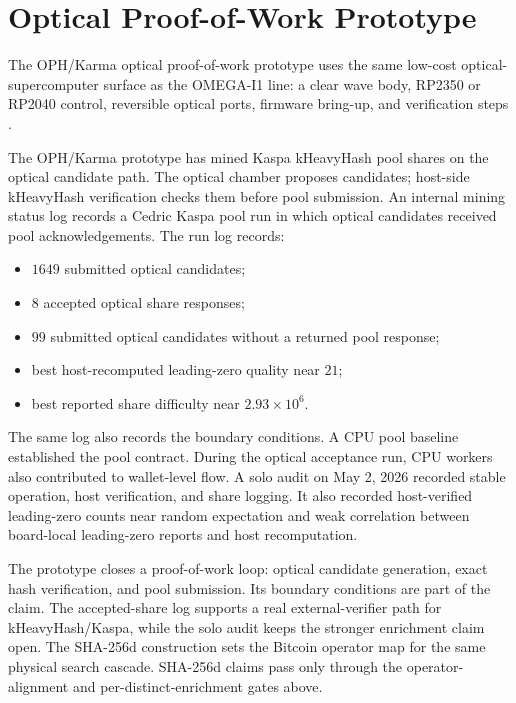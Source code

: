 \documentclass[11pt]{article}
\theoremstyle{definition}
\theoremstyle{remark}
\begin{document}
\section{Optical Proof-of-Work Prototype}

The OPH/Karma optical proof-of-work prototype uses the same low-cost
optical-supercomputer surface as the OMEGA-I1 line: a clear wave body, RP2350 or
RP2040 control, reversible optical ports, firmware bring-up, and verification
steps \cite{OmegaOpticalSupercomputer2026}.

The OPH/Karma prototype has mined Kaspa kHeavyHash pool shares on the optical
candidate path. The optical chamber proposes candidates; host-side kHeavyHash
verification checks them before pool submission. An internal mining status log
records a Cedric Kaspa pool run in which optical candidates received pool
acknowledgements. The run log records:

\begin{itemize}
\item \(1649\) submitted optical candidates;
\item \(8\) accepted optical share responses;
\item \(99\) submitted optical candidates without a returned pool response;
\item best host-recomputed leading-zero quality near \(21\);
\item best reported share difficulty near \(2.93\times 10^6\).
\end{itemize}

The same log also records the boundary conditions. A CPU pool baseline
established the pool contract. During the optical acceptance run, CPU workers
also contributed to wallet-level flow. A solo audit on May 2, 2026 recorded stable
operation, host verification, and share logging. It also recorded
host-verified leading-zero counts near random expectation and weak correlation
between board-local leading-zero reports and host recomputation.

The prototype closes a proof-of-work loop: optical candidate generation, exact
hash verification, and pool submission. Its boundary conditions are part of the
claim. The accepted-share log supports a real external-verifier path for
kHeavyHash/Kaspa, while the solo audit keeps the stronger enrichment claim open.
The SHA-256d construction sets the Bitcoin operator map for the same physical
search cascade. SHA-256d claims pass only through the operator-alignment and
per-distinct-enrichment gates above.
\end{document}
